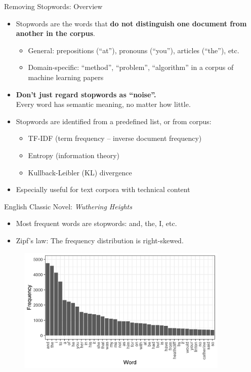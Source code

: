 \documentclass{beamer}
\renewcommand{\cite}{\citep}
\begin{document}
\begin{frame}{Removing Stopwords: Overview}
\begin{itemize}
\item Stopwords are the words that \textbf{do not distinguish one document from another in the corpus}.~\cite{ferilli2014automatic}
	\begin{itemize}
	\item General: prepositions (``at''), pronouns (``you''), articles (``the''), etc.
	\item Domain-specific: ``method'', ``problem'', ``algorithm'' in a corpus of machine learning papers~\cite{fan2017promoting}
	\end{itemize}
	\bigskip
\item\textbf{Don't just regard stopwords as ``noise''.}\\ 
	Every word has semantic meaning, no matter how little.
	\bigskip
\item Stopwords are identified from a predefined list, or from corpus:
	\begin{itemize}
	\item TF-IDF (term frequency -- inverse document frequency) 
	\item Entropy (information theory)~\cite{gerlach2019universal}
	\item Kullback-Leibler (KL) divergence~\cite{sarica2020stopwords}
	\end{itemize}
\item Especially useful for text corpora with technical content
\end{itemize}
\end{frame}

\begin{frame}{English Classic Novel: \textit{Wuthering Heights}}
\begin{itemize}
\item Most frequent words are stopwords: and, the, I, etc.
\item Zipf's law: The frequency distribution is right-skewed.~\cite{zipf1949human}
\end{itemize}
\begin{figure}[!ht]
	\centering
	\includegraphics[width=0.90\textwidth]{Figures/corpus_graph.png}
\end{figure}
\end{frame}
\end{document}
